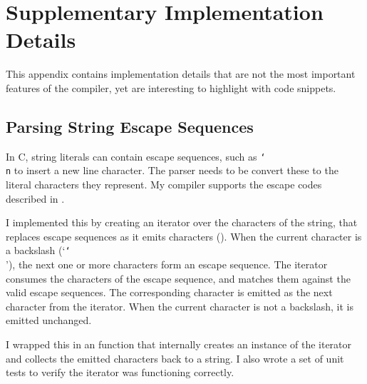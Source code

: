 \documentclass[../00-main.tex]{subfiles}
\begin{document}
\chapter{Supplementary Implementation Details}

This appendix contains implementation details that are not the most important features of the compiler, yet are interesting to highlight with code snippets.

\section{Parsing String Escape Sequences}\label{app:sec:parsing string escape sequences}

In C, string literals can contain escape sequences, such as \texttt{\char`\\n} to insert a new line character.
The parser needs to be convert these to the literal characters they represent.
My compiler supports the escape codes described in .

I implemented this by creating an iterator over the characters of the string, that replaces escape sequences as it emits characters ().
When the current character is a backslash (`\texttt{\char`\\}'), the next one or more characters form an escape sequence.
The iterator consumes the characters of the escape sequence, and matches them against the valid escape sequences.
The corresponding character is emitted as the next character from the iterator.
When the current character is not a backslash, it is emitted unchanged.

I wrapped this in an  function that internally creates an instance of the iterator and collects the emitted characters back to a string.
I also wrote a set of unit tests to verify the iterator was functioning correctly.
\end{document}
